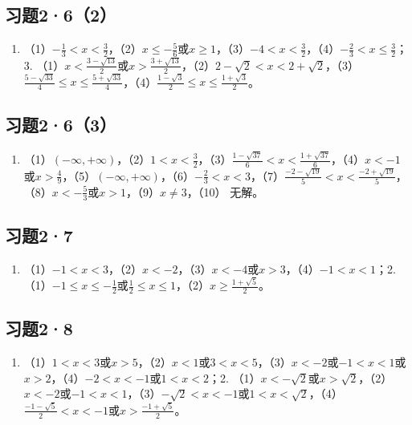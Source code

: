 \subsection{习题2·6（2）}

\begin{enumerate}[start=2]
\item
  （1）\(-\frac{1}{3} < x < \frac{3}{2}\)，（2）\(x \leqslant -\frac{5}{6}\)或\(x \geqslant 1\)，（3）\(-4 < x < \frac{3}{2}\)，（4）\(-\frac{2}{3} < x \leqslant \frac{3}{2}\)；3.
  （1）\(x < \frac{3 - \sqrt{13}}{2}\)或\(x > \frac{3 + \sqrt{13}}{2}\)，（2）\(2 - \sqrt{2} < x < 2 + \sqrt{2}\)，（3）\(\frac{5 - \sqrt{33}}{4} \leqslant x \leqslant \frac{5 + \sqrt{33}}{4}\)，（4）\(\frac{1 - \sqrt{3}}{2} \leqslant x \leqslant \frac{1 + \sqrt{3}}{2}\)。
\end{enumerate}

\subsection{习题2·6（3）}

\begin{enumerate}[start=3]
\item
  （1）\((- \infty, + \infty)\)，（2）\(1 < x < \frac{3}{2}\)，（3）\(\frac{1 - \sqrt{37}}{6} < x < \frac{1 + \sqrt{37}}{6}\)，（4）\(x < -1\)或\(x > \frac{4}{9}\)，（5）\((- \infty, + \infty)\)，（6）\(-\frac{2}{3} < x < 3\)，（7）\(\frac{-2 - \sqrt{19}}{5} < x < \frac{-2 + \sqrt{19}}{5}\)，（8）\(x < -\frac{5}{3}\)或\(x > 1\)，（9）\(x \neq 3\)，（10）
  无解。
\end{enumerate}

\subsection{习题2·7}

\begin{enumerate}
\item
  （1）\(-1 < x < 3\)，（2）\(x < -2\)，（3）\(x < -4\)或\(x > 3\)，（4）\(-1 < x < 1\)；2.
  （1）\(-1 \leqslant x \leqslant -\frac{1}{2}\)或\(\frac{1}{2} \leqslant x \leqslant 1\)，（2）\(x \geqslant \frac{1 + \sqrt{5}}{2}\)。
\end{enumerate}

\subsection{习题2·8}

\begin{enumerate}
\item
  （1）\(1 < x < 3\)或\(x > 5\)，（2）\(x < 1\)或\(3 < x < 5\)，（3）\(x < -2\)或\(-1 < x < 1\)或\(x > 2\)，（4）\(-2 < x < -1\)或\(1 < x < 2\)；2.
  （1）\(x < -\sqrt{2}\)或\(x > \sqrt{2}\)，（2）\(x < -2\)或\(-1 < x < 1\)，（3）\(-\sqrt{2} < x < -1\)或\(1 < x < \sqrt{2}\)，（4）\(\frac{-1 - \sqrt{5}}{2} < x < -1\)或\(x > \frac{-1 + \sqrt{5}}{2}\)。
\end{enumerate}

